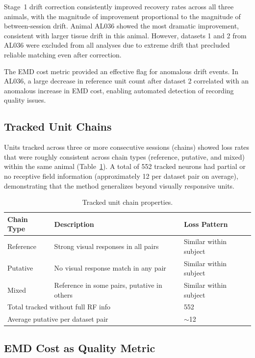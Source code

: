 \documentclass[12pt]{article}
\begin{document}
Stage~1 drift correction consistently improved recovery rates across all three animals, with the magnitude of improvement proportional to the magnitude of between-session drift. Animal AL036 showed the most dramatic improvement, consistent with larger tissue drift in this animal. However, datasets 1 and 2 from AL036 were excluded from all analyses due to extreme drift that precluded reliable matching even after correction.

The EMD cost metric provided an effective flag for anomalous drift events. In AL036, a large decrease in reference unit count after dataset 2 correlated with an anomalous increase in EMD cost, enabling automated detection of recording quality issues.

\subsection{Tracked Unit Chains}

Units tracked across three or more consecutive sessions (chains) showed loss rates that were roughly consistent across chain types (reference, putative, and mixed) within the same animal (Table~\ref{tab:chains}). A total of 552 tracked neurons had partial or no receptive field information (approximately 12 per dataset pair on average), demonstrating that the method generalizes beyond visually responsive units.

\begin{table}[ht]
\centering
\caption{Tracked unit chain properties.}
\label{tab:chains}
\begin{tabular}{lll}
\toprule
Chain Type & Description & Loss Pattern \\
\midrule
Reference & Strong visual responses in all pairs & Similar within subject \\
Putative & No visual response match in any pair & Similar within subject \\
Mixed & Reference in some pairs, putative in others & Similar within subject \\
\midrule
\multicolumn{2}{l}{Total tracked without full RF info} & 552 \\
\multicolumn{2}{l}{Average putative per dataset pair} & $\sim$12 \\
\bottomrule
\end{tabular}
\end{table}

\subsection{EMD Cost as Quality Metric}
\end{document}

